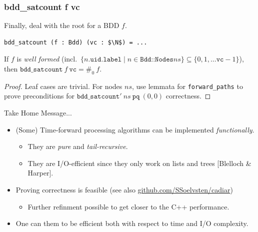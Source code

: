 \documentclass[english, aspectratio=169]{beamer}
\newcommand{\ns}[0]{\ensuremath{\mathit{ns}}}
\newcommand{\pq}[0]{\ensuremath{\texttt{pq}}}
\newcommand{\vc}[0]{\ensuremath{\texttt{vc}}}
\begin{document}
\begin{frame} %
  \frametitle{bdd\_satcount f vc}

  Finally, deal with the root for a BDD $f$.

  \begin{lstlisting}
bdd_satcount (f : Bdd) (vc : $\N$) = ...
  \end{lstlisting}

  \begin{theorem}
    If $f$ is \emph{well formed} (incl.\
    $\{ n.\texttt{uid}.\texttt{label} \mid n \in \texttt{Bdd::Nodes} \ns \} \subseteq \{ 0, 1,
    \dots \vc-1 \}$),\\then $\texttt{bdd\_satcount}\ f\ \vc = \#_0\ f$.
  \end{theorem}
  \begin{proof}
    Leaf cases are trivial. For nodes \ns, use lemmata for \texttt{forward\_paths} to prove
    preconditions for $\texttt{bdd\_satcount}'\ \ns\ \pq\ (0,0)$ correctness.
  \end{proof}
\end{frame}

\blankframe

\begin{frame}
  \begin{center}
    \LARGE\bf

    Take Home Message...
  \end{center}

  \begin{itemize}
  \item (Some) Time-forward processing algorithms can be implemented \emph{functionally}.
    \begin{itemize}
    \item They are \emph{pure} and \emph{tail-recursive}.
    \item They are I/O-efficient since they only work on lists and trees [Blelloch \& Harper].
    \end{itemize}

    \bigskip

  \item Proving correctness is feasible (see also
    \href{https://github.com/SSoelvsten/cadiar}{github.com/SSoelvsten/cadiar})
    \begin{itemize}
    \item Further refinment possible to get closer to the C++ performance.
    \end{itemize}

    \bigskip

  \item One can them to be efficient both with respect to time and I/O complexity.
  \end{itemize}
\end{frame}
\end{document}

